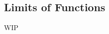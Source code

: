 \documentclass[../poma-notes.tex]{subfiles}
\begin{document}
\subsection*{Limits of Functions}

WIP
\end{document}
